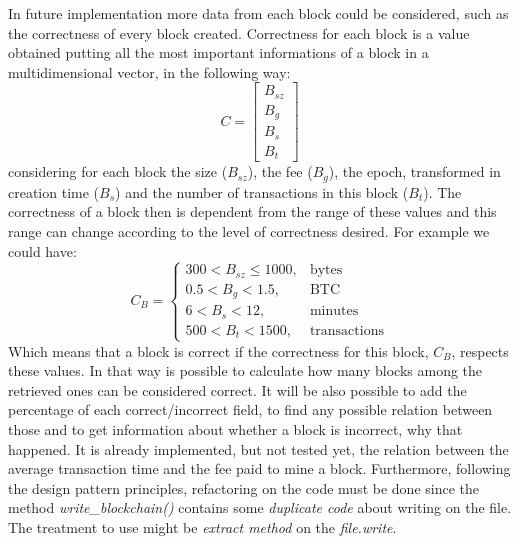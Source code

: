 \documentclass[USenglish]{uit-thesis}
\begin{document}
In future implementation more data from each block could be considered, such
as the correctness of every block created. Correctness for each block is a value obtained
putting all the most important informations of a block in a multidimensional vector, in the
following way:
\begin{equation}
\label{eq:correctness_vector}
	C=\begin{bmatrix}
		B_{sz} \\
		B_g\\
		B_s\\
		B_t
	\end{bmatrix}
\end{equation}
considering for each block the size ($B_{sz}$), the fee ($B_g$), the epoch,
transformed in creation time ($B_s$) and the
number of transactions in this block ($B_t$).
The correctness of a block then is dependent from the range of these values
and this range can change according to the level of correctness desired.
For example we could have:
\begin{equation}
C_B = \begin{cases}
300 < B_{sz} \leqslant 1000, & \mbox{bytes} \\
0.5 < B_g < 1.5, & \mbox{BTC} \\
6 < B_s < 12, & \mbox{minutes} \\
500 < B_t < 1500, & \mbox{transactions}
\end{cases}
\end{equation}
Which means that a block is correct if the correctness for this block, $C_B$, respects
these values. In that way is possible to calculate how many blocks among the
retrieved ones can be considered correct. It will be also possible to add the percentage
of each correct/incorrect field, to find any possible relation between those and to get
information about whether a block is incorrect, why that happened.
It is already implemented, but not tested yet, the relation between the average
transaction time and the fee paid to mine a block.
Furthermore, following the design pattern principles, refactoring on the code must be done since
the method \emph{write\_blockchain()} contains some \emph{duplicate code} about writing on
the file. The treatment to use might be \emph{extract method} on the \emph{file.write}.
\end{document}
